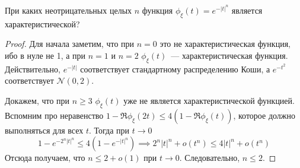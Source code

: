 \begin{problem}
	При каких неотрицательных целых \(n\) функция \(\phi_{\xi}(t) = 
	e^{-|t|^n}\) является характеристической?
\end{problem}
\begin{proof}
	Для начала заметим, что при \(n = 0\) это не характеристическая функция, 
	ибо в нуле не 1, а при \(n = 1\) и \(n = 2\) \(\phi_{\xi}(t)\)~--- 
	характеристическая функция. Действительно, \(e^{-|t|}\) соответствует 
	стандартному распределению Коши, а \(e^{-t^2}\) соответствует 
	\(\mathcal{N}(0, 2)\).
	
	Докажем, что при \(n \geq 3\) \(\phi_{\xi}(t)\) уже не является 
	характеристической функцией. Вспомним про неравенство \(1 - \Re 
	\phi_{\xi}(2t) \leq 4(1 - \Re \phi_{\xi}(t))\), которое должно выполняться 
	для всех \(t\). Тогда при \(t \to 0\)
	\[
	1 - e^{-2^n|t|^n} \leq 4(1 - e^{-|t|^n}) \implies 2^n|t|^n + o(t^n) \leq 
	4|t|^n + o(t^n)
	\]
	Отсюда получаем, что \(n \leq 2 + o(1)\) при \(t \to 0\). Следовательно, 
	\(n \leq 2\). 
\end{proof}

